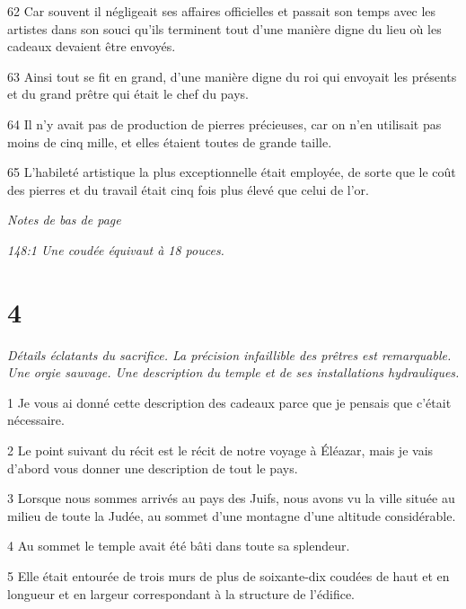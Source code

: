 \par 62 Car souvent il négligeait ses affaires officielles et passait son temps avec les artistes dans son souci qu'ils terminent tout d'une manière digne du lieu où les cadeaux devaient être envoyés.

\par 63 Ainsi tout se fit en grand, d'une manière digne du roi qui envoyait les présents et du grand prêtre qui était le chef du pays.

\par 64 Il n'y avait pas de production de pierres précieuses, car on n'en utilisait pas moins de cinq mille, et elles étaient toutes de grande taille.

\par 65 L'habileté artistique la plus exceptionnelle était employée, de sorte que le coût des pierres et du travail était cinq fois plus élevé que celui de l'or.

\par \textit{Notes de bas de page}

\par \textit{148:1 Une coudée équivaut à 18 pouces.}

\chapter{4}

\par \textit{Détails éclatants du sacrifice. La précision infaillible des prêtres est remarquable. Une orgie sauvage. Une description du temple et de ses installations hydrauliques.}

\par 1 Je vous ai donné cette description des cadeaux parce que je pensais que c'était nécessaire.

\par 2 Le point suivant du récit est le récit de notre voyage à Éléazar, mais je vais d'abord vous donner une description de tout le pays.

\par 3 Lorsque nous sommes arrivés au pays des Juifs, nous avons vu la ville située au milieu de toute la Judée, au sommet d'une montagne d'une altitude considérable.

\par 4 Au sommet le temple avait été bâti dans toute sa splendeur.

\par 5 Elle était entourée de trois murs de plus de soixante-dix coudées de haut et en longueur et en largeur correspondant à la structure de l'édifice.

